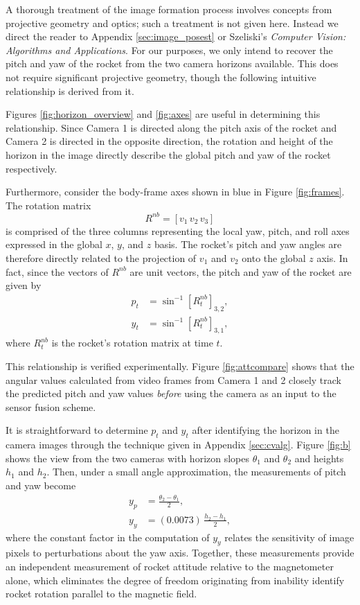 \documentclass{article}
\begin{document}
A thorough treatment of the image formation process involves concepts from projective geometry and optics; such a treatment is not given here. Instead we direct the reader to Appendix \ref{sec:image_posest} or Szeliski's \textit{Computer Vision: Algorithms and Applications}. For our purposes, we only intend to recover the pitch and yaw of the rocket from the two camera horizons available. This does not require significant projective geometry, though the following intuitive relationship is derived from it.

Figures \ref{fig:horizon_overview} and \ref{fig:axes} are useful in determining this relationship. Since Camera 1 is directed along the pitch axis of the rocket and Camera 2 is directed in the opposite direction, the rotation and height of the horizon in the image directly describe the global pitch and yaw of the rocket respectively.

Furthermore, consider the body-frame axes shown in blue in Figure \ref{fig:frames}. The rotation matrix 
\[
R^{nb} = [v_1 \, v_2 \, v_3]
\]
is comprised of the three columns representing the local yaw, pitch, and roll axes expressed in the global $x$, $y$, and $z$ basis. The rocket's pitch and yaw angles are therefore directly related to the projection of $v_1$ and $v_2$ onto the global $z$ axis. In fact, since the vectors of $R^{nb}$ are unit vectors, the pitch and yaw of the rocket are given by 
\begin{align}
    p_t &= \sin^{-1} [R_t^{nb}]_{3,2},\\
    y_t &= \sin^{-1} [R_t^{nb}]_{3,1},
\end{align}
where $R_t^{nb}$ is the rocket's rotation matrix at time $t$. 

This relationship is verified experimentally. Figure \ref{fig:attcompare} shows that the angular values calculated from video frames from Camera 1 and 2 closely track the predicted pitch and yaw values \textit{before} using the camera as an input to the sensor fusion scheme.

It is straightforward to determine $p_t$ and $y_t$ after identifying the horizon in the camera images through the technique given in Appendix \ref{sec:cvalg}. Figure \ref{fig:b} shows the view from the two cameras with horizon slopes $\theta_1$ and $\theta_2$ and heights $h_1$ and $h_2$. Then,
under a small angle approximation, the measurements of pitch and yaw become
\begin{align*}
    y_p &= \frac{\theta_2 - \theta_1}{2},\\
    y_y &= (0.0073) \, \frac{h_2 - h_1}{2} ,
\end{align*}
where the constant factor in the computation of $y_y$ relates the sensitivity of image pixels to perturbations about the yaw axis. Together, these measurements provide an independent measurement of rocket attitude relative to the magnetometer alone, which eliminates the degree of freedom originating from inability identify rocket rotation parallel to the magnetic field.
\end{document}
